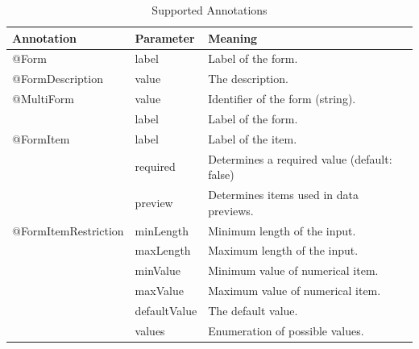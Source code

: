 \documentclass[conference]{IEEEtran}
\begin{document}
\begin{table}
\begin{tabular}{|l|l|l|}
\hline
{\bf Annotation} & {\bf Parameter} & {\bf Meaning} \\
\hline
     @Form &      label & Label of the form. \\
\hline
@FormDescription &      value & The description. \\
\hline
\multicolumn{ 1}{|l|}{@MultiForm} &      value & Identifier of the form (string). \\

\multicolumn{ 1}{|l|}{} &      label & Label of the form. \\
\hline
\multicolumn{ 1}{|l|}{@FormItem} &      label & Label of the item. \\

\multicolumn{ 1}{|l|}{} &   required & Determines a required value (default: false) \\

\multicolumn{ 1}{|l|}{} &    preview & Determines items used in data previews. \\
\hline
\multicolumn{ 1}{|l|}{@FormItemRestriction} &  minLength & Minimum length of the input. \\

\multicolumn{ 1}{|l|}{} &  maxLength & Maximum length of the input. \\

\multicolumn{ 1}{|l|}{} &   minValue & Minimum value of numerical item. \\

\multicolumn{ 1}{|l|}{} &   maxValue & Maximum value of numerical item. \\

\multicolumn{ 1}{|l|}{} & defaultValue & The default value. \\

\multicolumn{ 1}{|l|}{} &     values & Enumeration of possible values. \\
\hline
\end{tabular}
\caption{\label{annotations}Supported Annotations}
\end{table}
\end{document}
